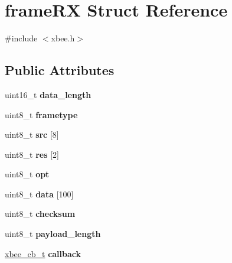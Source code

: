 \hypertarget{structframe_r_x}{}\section{frame\+RX Struct Reference}
\label{structframe_r_x}


{\ttfamily \#include $<$xbee.\+h$>$}

\subsection*{Public Attributes}
\begin{DoxyCompactItemize}
\item 
\mbox{\label{structframe_r_x_af463ce209cea0fd24f7e20c1a51f7fc6}} 
uint16\+\_\+t {\bfseries data\+\_\+length}
\item 
\mbox{\label{structframe_r_x_a4684f3a419d7c6eaf5bded40cec73cdf}} 
uint8\+\_\+t {\bfseries frametype}
\item 
\mbox{\label{structframe_r_x_a4a465dedf00b5d81f2f337c987b0ce96}} 
uint8\+\_\+t {\bfseries src} \mbox{[}8\mbox{]}
\item 
\mbox{\label{structframe_r_x_a339160d2b3a24b3db0ea4318fc36227c}} 
uint8\+\_\+t {\bfseries res} \mbox{[}2\mbox{]}
\item 
\mbox{\label{structframe_r_x_a46a068d1f1deb22e9e415b1ced537516}} 
uint8\+\_\+t {\bfseries opt}
\item 
\mbox{\label{structframe_r_x_afdb061e4b3b406bf4890e95de2fbf474}} 
uint8\+\_\+t {\bfseries data} \mbox{[}100\mbox{]}
\item 
\mbox{\label{structframe_r_x_a2ef590f48976b2550c7e12f2accf1e2f}} 
uint8\+\_\+t {\bfseries checksum}
\item 
\mbox{\label{structframe_r_x_a8ffb1ad18c41d6943c8172042f965123}} 
uint8\+\_\+t {\bfseries payload\+\_\+length}
\item 
\mbox{\label{structframe_r_x_a9483c0994c50cd55141215e73a75b95b}} 
\hyperlink{xbee_8h_a6234cefbfc9f98d18078b749c2615a1f}{xbee\+\_\+cb\+\_\+t} {\bfseries callback}
\end{DoxyCompactItemize}


